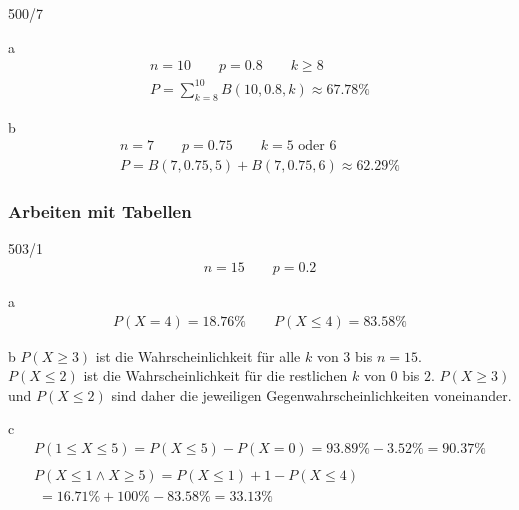 \begin{exercise}{500/7}
  \item [a]
  \begin{gather*}
    n = 10 \qquad p = 0.8 \qquad k \geq 8 \\
    P = \sum_{k = 8}^{10} B(10, 0.8, k) \approx 67.78\%
  \end{gather*}
  \item [b]
  \begin{gather*}
    n = 7 \qquad p = 0.75 \qquad k = 5 \text{ oder } 6 \\
    P = B(7, 0.75, 5) + B(7, 0.75, 6) \approx 62.29\%
  \end{gather*}
\end{exercise}
\subsubsection{Arbeiten mit Tabellen}
\begin{exercise}{503/1}
  \begin{gather*}
    n = 15 \qquad p = 0.2
  \end{gather*}
  \item [a]
  \begin{gather*}
    P(X = 4) = 18.76\% \qquad P(X \leq 4) = 83.58\%
  \end{gather*}
  \item [b]
  $P(X \geq 3)$ ist die Wahrscheinlichkeit für alle $k$ von $3$ bis $n = 15$. \\
  $P(X \leq 2)$ ist die Wahrscheinlichkeit für die restlichen $k$ von $0$ bis $2$. $P(X \geq 3)$ und $P(X \leq 2)$ sind daher die jeweiligen Gegenwahrscheinlichkeiten voneinander.
  \item [c]
  \begin{gather*}
    P(1 \leq X \leq 5) = P(X \leq 5) - P(X = 0) = 93.89\% - 3.52\% = 90.37\% \\\\
    P(X \leq 1 \wedge X \geq 5) = P(X \leq 1) + 1 - P(X \leq 4) \\
    \;= 16.71\% + 100\% - 83.58\% = 33.13\%
  \end{gather*}
\end{exercise}
